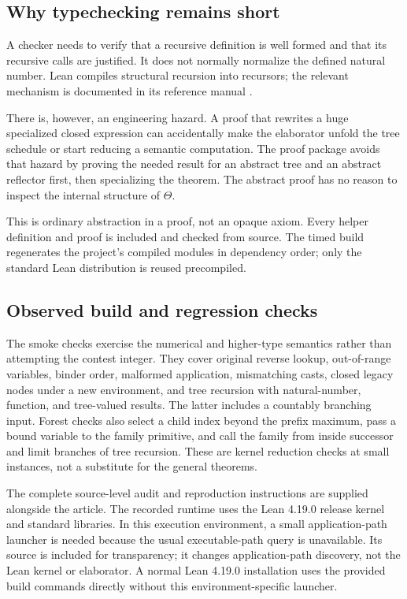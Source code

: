 \documentclass[11pt,a4paper]{article}
\theoremstyle{definition}
\begin{document}
\subsection{Why typechecking remains short}

A checker needs to verify that a recursive definition is well formed and
that its recursive calls are justified. It does not normally normalize the
defined natural number. Lean compiles structural recursion into recursors;
the relevant mechanism is documented in its reference manual
\cite{leanrecursion}.

There is, however, an engineering hazard. A proof that rewrites a huge
specialized closed expression can accidentally make the elaborator unfold
the tree schedule or start reducing a semantic computation. The proof
package avoids that hazard by proving the needed result for an abstract tree
and an abstract reflector first, then specializing the theorem. The abstract
proof has no reason to inspect the internal structure of \(\Theta\).

This is ordinary abstraction in a proof, not an opaque axiom. Every helper
definition and proof is included and checked from source. The timed build
regenerates the project's compiled modules in dependency order; only the
standard Lean distribution is reused precompiled.

\subsection{Observed build and regression checks}



The smoke checks exercise the numerical and higher-type semantics rather
than attempting the contest integer. They cover original reverse lookup,
out-of-range variables, binder order, malformed application, mismatching
casts, closed legacy nodes under a new environment, and tree recursion with
natural-number, function, and tree-valued results. The latter includes a
countably branching input. Forest checks also select a child index beyond
the prefix maximum, pass a bound variable to the family primitive, and call
the family from inside successor and limit branches of tree recursion.
These are kernel reduction checks at small
instances, not a substitute for the general theorems.

The complete source-level audit and reproduction instructions are supplied
alongside the article. The recorded runtime uses the Lean 4.19.0 release
kernel and standard libraries. In this execution environment, a small
application-path launcher is needed because the usual executable-path
query is unavailable. Its source is included for transparency; it changes
application-path discovery, not the Lean kernel or elaborator. A normal
Lean 4.19.0 installation uses the provided build commands directly without
this environment-specific launcher.
\end{document}
